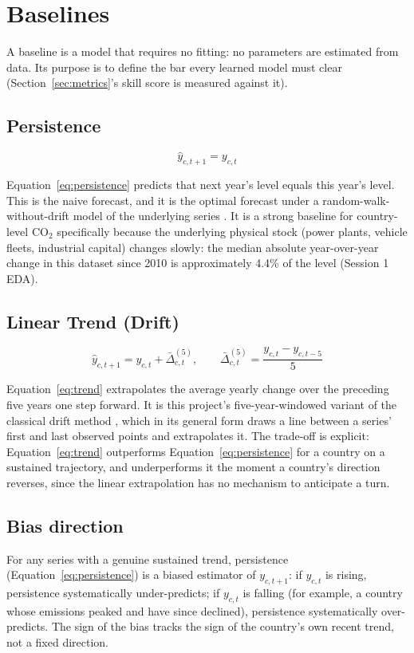 \section{Baselines}
\label{sec:baselines}

A baseline is a model that requires no fitting: no parameters are
estimated from data. Its purpose is to define the bar every learned model
must clear (Section~\ref{sec:metrics}'s skill score is measured against
it).

\subsection{Persistence}

\begin{equation}
\label{eq:persistence}
\hat y_{c,t+1} = y_{c,t}
\end{equation}

Equation~\ref{eq:persistence} predicts that next year's level equals this
year's level. This is the naive forecast, and it is the optimal forecast
under a random-walk-without-drift model of the underlying series
\cite{hyndman2021forecasting}. It is a strong baseline for country-level
CO$_2$ specifically because the underlying physical stock (power plants,
vehicle fleets, industrial capital) changes slowly: the median absolute
year-over-year change in this dataset since 2010 is approximately 4.4\%
of the level (Session 1 EDA).

\subsection{Linear Trend (Drift)}

\begin{equation}
\label{eq:trend}
\hat y_{c,t+1} = y_{c,t} + \bar\Delta_{c,t}^{(5)},
\qquad
\bar\Delta_{c,t}^{(5)} = \frac{y_{c,t} - y_{c,t-5}}{5}
\end{equation}

Equation~\ref{eq:trend} extrapolates the average yearly change over the
preceding five years one step forward. It is this project's
five-year-windowed variant of the classical drift method
\cite{hyndman2021forecasting}, which in its general form draws a line
between a series' first and last observed points and extrapolates it. The
trade-off is explicit: Equation~\ref{eq:trend} outperforms
Equation~\ref{eq:persistence} for a country on a sustained trajectory, and
underperforms it the moment a country's direction reverses, since the
linear extrapolation has no mechanism to anticipate a turn.

\subsection{Bias direction}

For any series with a genuine sustained trend, persistence
(Equation~\ref{eq:persistence}) is a biased estimator of $y_{c,t+1}$: if
$y_{c,t}$ is rising, persistence systematically under-predicts; if
$y_{c,t}$ is falling (for example, a country whose emissions peaked and
have since declined), persistence systematically over-predicts. The sign
of the bias tracks the sign of the country's own recent trend, not a
fixed direction.
